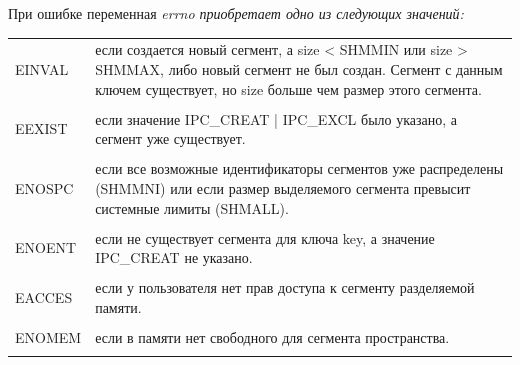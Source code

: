 \documentclass[a4paper]{article}
\begin{document}
При ошибке переменная \sl errno \rm приобретает одно из следующих значений:
\begin{tabular}{p{3cm}p{12cm}}
EINVAL & если создается новый сегмент, а size < SHMMIN или size > SHMMAX, либо новый сегмент не был создан. Сегмент с данным ключем существует, но size больше чем размер этого сегмента.\\\\
EEXIST & если значение IPC\_CREAT | IPC\_EXCL было указано, а сегмент уже существует.\\\\
ENOSPC & если все возможные идентификаторы сегментов уже распределены (SHMMNI) или если размер выделяемого сегмента превысит системные лимиты (SHMALL).\\\\
ENOENT & если не существует сегмента для ключа key, а значение IPC\_CREAT не указано.\\\\
EACCES & если у пользователя нет прав доступа к сегменту разделяемой памяти.\\\\
ENOMEM & если в памяти нет свободного для сегмента пространства.\\\\
\end{tabular}
\end{document}
